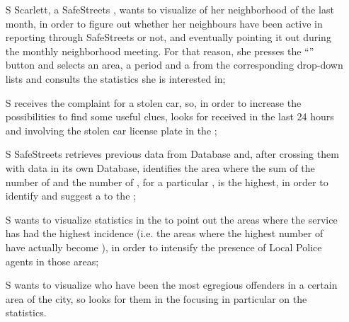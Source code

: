 \documentclass[../../../rasd.tex]{subfiles}
\begin{document}
\begin{itemize}
	\item[S\subs{5}]Scarlett, a SafeStreets , wants to visualize  of her neighborhood of the last month, in order to figure out whether her neighbours have been active in reporting  through SafeStreets or not, and eventually pointing it out during the monthly neighborhood meeting. For that reason, she presses the “” button and selects an area, a period and a  from the corresponding drop-down lists and consults the statistics she is interested in;
	
	\item[S\subs{6}] receives the complaint for a stolen car, so, in order to increase the possibilities to find some useful clues, looks for  received in the last 24 hours and involving the stolen car license plate in the ;
	
	\item[S\subs{7}]SafeStreets retrieves previous  data from  Database and, after crossing them with  data in its own Database, identifies the area where the sum of the number of  and the number of , for a particular , is the highest, in order to identify and suggest a  to the ;
	
	\item[S\subs{8}] wants to visualize  statistics in the  to point out the areas where the service has had the highest incidence (i.e. the areas where the highest number of  have actually become ), in order to intensify the presence of Local Police agents in those areas;
	
	\item[S\subs{9}] wants to visualize who have been the most egregious offenders in a certain area of the city, so looks for them in the  focusing in particular on the  statistics.
	
\end{itemize}
\end{document}
